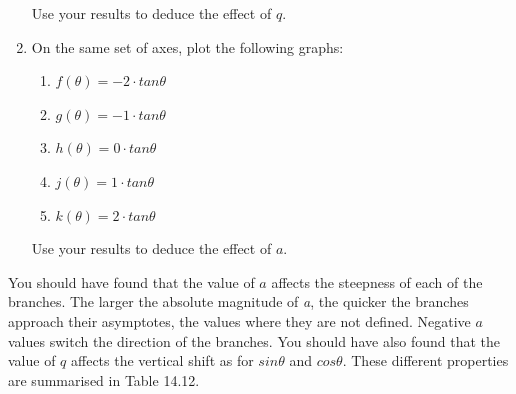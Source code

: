 \begin{enumerate}[noitemsep, label=\textbf{\arabic*}. ]
Use your results to deduce the effect of \begin{math}q\end{math}.
\label{m39414*uid80}\item On the same set of axes, plot the following graphs:
\label{m39414*id90547}\begin{enumerate}[noitemsep, label=\textbf{\alph*}. ] 
            \label{m39414*uid81}\item \begin{math}f\left(\theta \right)=-2\ensuremath{\cdot}tan\theta \end{math}\label{m39414*uid82}\item \begin{math}g\left(\theta \right)=-1\ensuremath{\cdot}tan\theta \end{math}\label{m39414*uid83}\item \begin{math}h\left(\theta \right)=0\ensuremath{\cdot}tan\theta \end{math}\label{m39414*uid84}\item \begin{math}j\left(\theta \right)=1\ensuremath{\cdot}tan\theta \end{math}\label{m39414*uid85}\item \begin{math}k\left(\theta \right)=2\ensuremath{\cdot}tan\theta \end{math}\end{enumerate}
        
Use your results to deduce the effect of \begin{math}a\end{math}.
\end{enumerate}
        
        
        

        \label{m39414*id90781}You should have found that the value of \begin{math}a\end{math} affects the steepness of each of the branches. The larger the absolute magnitude of \textsl{a}, the quicker the branches approach their asymptotes, the values where they are not defined. Negative \begin{math}\mathit{a}\end{math} values switch the direction of the branches.
You should have also found that the value of \begin{math}q\end{math} affects the vertical shift as for \begin{math}sin\theta \end{math} and \begin{math}cos\theta \end{math}.
These different properties are summarised in Table 14.12.\par 
        
